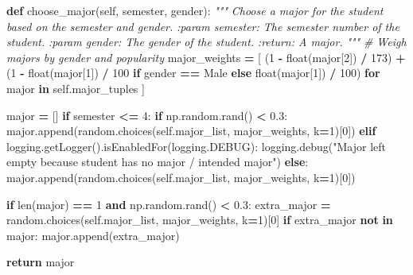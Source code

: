 \documentclass[
  twocolumn]{article}
\newenvironment{Shaded}{\begin{snugshade}}{\end{snugshade}}
\newcommand{\BuiltInTok}[1]{#1}
\newcommand{\CommentTok}[1]{\textcolor[rgb]{0.56,0.35,0.01}{\textit{#1}}}
\newcommand{\ControlFlowTok}[1]{\textcolor[rgb]{0.13,0.29,0.53}{\textbf{#1}}}
\newcommand{\DecValTok}[1]{\textcolor[rgb]{0.00,0.00,0.81}{#1}}
\newcommand{\FloatTok}[1]{\textcolor[rgb]{0.00,0.00,0.81}{#1}}
\newcommand{\KeywordTok}[1]{\textcolor[rgb]{0.13,0.29,0.53}{\textbf{#1}}}
\newcommand{\NormalTok}[1]{#1}
\newcommand{\OperatorTok}[1]{\textcolor[rgb]{0.81,0.36,0.00}{\textbf{#1}}}
\newcommand{\StringTok}[1]{\textcolor[rgb]{0.31,0.60,0.02}{#1}}
\newcommand{\VariableTok}[1]{\textcolor[rgb]{0.00,0.00,0.00}{#1}}
\begin{document}
\begin{Shaded}
\begin{Highlighting}[]
\KeywordTok{def}\NormalTok{ choose\_major(}\VariableTok{self}\NormalTok{, semester, gender):}
        \CommentTok{"""}
\CommentTok{        Choose a major for the student based on the semester and gender.}
\CommentTok{        :param semester: The semester number of the student.}
\CommentTok{        :param gender: The gender of the student.}
\CommentTok{        :return: A major.}
\CommentTok{        """}
        \CommentTok{\# Weigh majors by gender and popularity}
\NormalTok{        major\_weights }\OperatorTok{=}\NormalTok{ [}
\NormalTok{            (}\DecValTok{1} \OperatorTok{{-}} \BuiltInTok{float}\NormalTok{(major[}\DecValTok{2}\NormalTok{]) }\OperatorTok{/} \DecValTok{173}\NormalTok{) }\OperatorTok{+}\NormalTok{ (}\DecValTok{1} \OperatorTok{{-}} \BuiltInTok{float}\NormalTok{(major[}\DecValTok{1}\NormalTok{]) }\OperatorTok{/} \DecValTok{100} \ControlFlowTok{if}\NormalTok{ gender }\OperatorTok{==} \StringTok{\textquotesingle{}Male\textquotesingle{}} \ControlFlowTok{else} \BuiltInTok{float}\NormalTok{(major[}\DecValTok{1}\NormalTok{]) }\OperatorTok{/} \DecValTok{100}\NormalTok{)}
            \ControlFlowTok{for}\NormalTok{ major }\KeywordTok{in} \VariableTok{self}\NormalTok{.major\_tuples}
\NormalTok{        ]}

\NormalTok{        major }\OperatorTok{=}\NormalTok{ []}
        \ControlFlowTok{if}\NormalTok{ semester }\OperatorTok{\textless{}=} \DecValTok{4}\NormalTok{:}
            \ControlFlowTok{if}\NormalTok{ np.random.rand() }\OperatorTok{\textless{}} \FloatTok{0.3}\NormalTok{:}
\NormalTok{                major.append(random.choices(}\VariableTok{self}\NormalTok{.major\_list, major\_weights, k}\OperatorTok{=}\DecValTok{1}\NormalTok{)[}\DecValTok{0}\NormalTok{])}
            \ControlFlowTok{elif}\NormalTok{ logging.getLogger().isEnabledFor(logging.DEBUG):}
\NormalTok{                logging.debug(}\StringTok{"Major left empty because student has no major / intended major"}\NormalTok{)}
        \ControlFlowTok{else}\NormalTok{:}
\NormalTok{            major.append(random.choices(}\VariableTok{self}\NormalTok{.major\_list, major\_weights, k}\OperatorTok{=}\DecValTok{1}\NormalTok{)[}\DecValTok{0}\NormalTok{])}

        \ControlFlowTok{if} \BuiltInTok{len}\NormalTok{(major) }\OperatorTok{==} \DecValTok{1} \KeywordTok{and}\NormalTok{ np.random.rand() }\OperatorTok{\textless{}} \FloatTok{0.3}\NormalTok{:}
\NormalTok{            extra\_major }\OperatorTok{=}\NormalTok{ random.choices(}\VariableTok{self}\NormalTok{.major\_list, major\_weights, k}\OperatorTok{=}\DecValTok{1}\NormalTok{)[}\DecValTok{0}\NormalTok{]}
            \ControlFlowTok{if}\NormalTok{ extra\_major }\KeywordTok{not} \KeywordTok{in}\NormalTok{ major:}
\NormalTok{                major.append(extra\_major)}
        
        \ControlFlowTok{return}\NormalTok{ major}
\end{Highlighting}
\end{Shaded}
\end{document}
